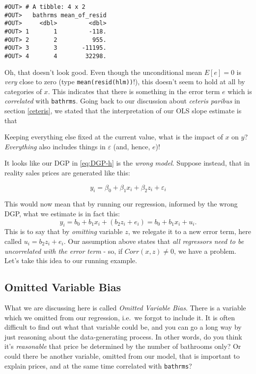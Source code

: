 \documentclass[]{book}
\newenvironment{tip}{\begin{tcolorbox}[colback=green!5!white,colframe=green]}{\end{tcolorbox}}
\begin{document}
\begin{verbatim}
#OUT> # A tibble: 4 x 2
#OUT>   bathrms mean_of_resid
#OUT>     <dbl>         <dbl>
#OUT> 1       1         -118.
#OUT> 2       2          955.
#OUT> 3       3       -11195.
#OUT> 4       4        32298.
\end{verbatim}

Oh, that doesn't look good. Even though the unconditional mean
\(E[e] = 0\) is \emph{very} close to zero (type
\texttt{mean(resid(hlm))}!), this doesn't seem to hold at all by
categories of \(x\). This indicates that there is something in the error
term \(e\) which is \emph{correlated} with \texttt{bathrms}. Going back
to our discussion about \emph{ceteris paribus} in section \ref{ceteris},
we stated that the interpretation of our OLS slope estimate is that

\begin{tip}
Keeping everything else fixed at the current value, what is the impact
of \(x\) on \(y\)? \emph{Everything} also includes things in
\(\varepsilon\) (and, hence, \(e\))!
\end{tip}

 It looks like our DGP in \eqref{eq:DGP-h} is the \emph{wrong model}.
Suppose instead, that in reality sales prices are generated like this:

\begin{equation}
y_i = \beta_0 + \beta_1 x_i + \beta_2 z_i + \varepsilon_i \label{eq:DGP-h2}
\end{equation}

This would now mean that by running our regression, informed by the
wrong DGP, what we estimate is in fact this: \[
y_i = b_0 + b_1 x_i + (b_2 z_i + e_i)  = b_0 + b_1 x_i + u_i.
\] This is to say that by \emph{omitting} variable \(z\), we relegate it
to a new error term, here called \(u_i = b_2 z_i + e_i\). Our assumption
above states that \emph{all regressors need to be uncorrelated with the
error term} - so, if \(Corr(x,z)\neq 0\), we have a problem. Let's take
this idea to our running example.

\subsection{Omitted Variable Bias}\label{omitted-variable-bias}

What we are discussing here is called \emph{Omitted Variable Bias}.
There is a variable which we omitted from our regression, i.e.~we forgot
to include it. It is often difficult to find out what that variable
could be, and you can go a long way by just reasoning about the
data-generating process. In other words, do you think it's
\emph{reasonable} that price be determined by the number of bathrooms
only? Or could there be another variable, omitted from our model, that
is important to explain prices, and at the same time correlated with
\texttt{bathrms}?
\end{document}
